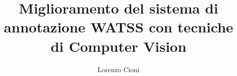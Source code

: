 \documentclass[12pt,a4paper,oneside,italian]{book}
\author{Lorenzo Cioni}
\title{\textbf{Miglioramento del sistema di annotazione WATSS con tecniche di Computer Vision}}
\begin{document}
\frontmatter
\maketitle  	%

\tableofcontents


\mainmatter{






}

\backmatter



\end{document}

